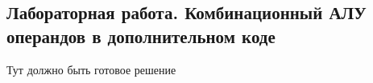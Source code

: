 \subsection{Лабораторная работа. Комбинационный АЛУ операндов в дополнительном коде}

Тут должно быть готовое решение